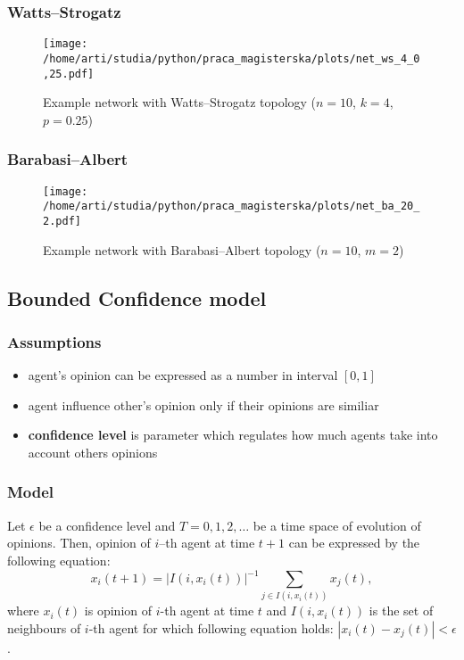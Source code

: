 \documentclass[a4paper, 11pt]{beamer}
\begin{document}
\begin{frame}
\frametitle{Watts--Strogatz}
\begin{figure}[H]
		\centering
		\texttt{[image: /home/arti/studia/python/praca\_magisterska/plots/net\_ws\_4\_0,25.pdf]}
		\caption{Example network with Watts--Strogatz topology ($n=10$, $k=4$, $p=0.25$)}
\end{figure}
\end{frame}

\begin{frame}
\frametitle{Barabasi--Albert}
\begin{figure}[H]
		\centering
		\texttt{[image: /home/arti/studia/python/praca\_magisterska/plots/net\_ba\_20\_2.pdf]}
		\caption{Example network with Barabasi--Albert topology ($n=10$, $m=2$)}
\end{figure}
\end{frame}

\subsection{Bounded Confidence model}
\begin{frame}
\frametitle{Assumptions}
\begin{itemize}
	\item agent's opinion can be expressed as a number in interval \textbf{$[0, 1]$} 
	\item agent influence other's opinion only if their opinions are similiar
	\item \textbf{confidence level} is parameter which regulates how much agents take into account others opinions
\end{itemize}
\end{frame}


\begin{frame}
\frametitle{Model}
Let $\epsilon$ be a confidence level and $T={0,1,2,\ldots}$ be a time space of evolution of opinions. Then, opinion of $i$--th agent at time $t+1$ can be expressed by the following equation:
\begin{equation}
x_i(t+1) = \left| I(i, x_i(t)) \right|^{-1} \sum_{j \in I(i, x_i(t))} {x_j(t)},
\label{bc}
\end{equation} 
where $x_i(t)$ is opinion of $i$-th agent at time $t$ and $I(i, x_i(t))$ is the set of neighbours of $i$-th agent for which following equation holds: $\left| x_i(t) - x_j(t) \right| < \epsilon$.
\end{frame}
\end{document}
